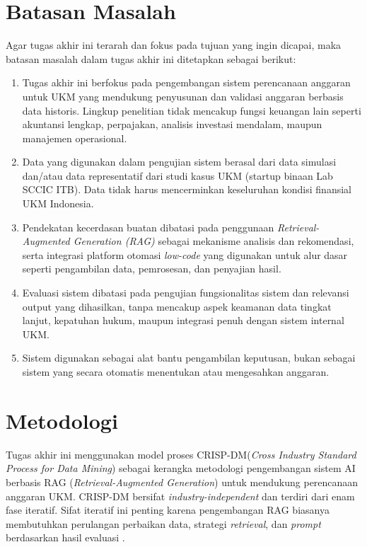 \section{Batasan Masalah}
Agar tugas akhir ini terarah dan fokus pada tujuan yang ingin dicapai, maka batasan masalah dalam tugas akhir ini ditetapkan sebagai berikut:
\begin{enumerate}
\item   Tugas akhir ini berfokus pada pengembangan sistem perencanaan anggaran untuk UKM yang mendukung penyusunan dan validasi anggaran berbasis data historis. Lingkup penelitian tidak mencakup fungsi keuangan lain seperti akuntansi lengkap, perpajakan, analisis investasi mendalam, maupun manajemen operasional.
\item   Data yang digunakan dalam pengujian sistem berasal dari data simulasi dan/atau data representatif dari studi kasus UKM (startup binaan Lab SCCIC ITB). Data tidak harus mencerminkan keseluruhan kondisi finansial UKM Indonesia.
\item   Pendekatan kecerdasan buatan dibatasi pada penggunaan \textit{Retrieval-Augmented Generation (RAG)} sebagai mekanisme analisis dan rekomendasi, serta integrasi platform otomasi \textit{low-code} yang digunakan untuk alur dasar seperti pengambilan data, pemrosesan, dan penyajian hasil.
\item   Evaluasi sistem dibatasi pada pengujian fungsionalitas sistem dan relevansi output yang dihasilkan, tanpa mencakup aspek keamanan data tingkat lanjut, kepatuhan hukum, maupun integrasi penuh dengan sistem internal UKM.
\item   Sistem digunakan sebagai alat bantu pengambilan keputusan, bukan sebagai sistem yang secara otomatis menentukan atau mengesahkan anggaran.
\end{enumerate}

\section{Metodologi}
Tugas akhir ini menggunakan model proses CRISP-DM(\textit{Cross Industry Standard Process for Data Mining}) sebagai kerangka metodologi pengembangan sistem AI berbasis RAG (\textit{Retrieval-Augmented Generation}) untuk mendukung perencanaan anggaran UKM.
CRISP-DM bersifat \textit{industry-independent} dan terdiri dari enam fase iteratif. Sifat iteratif ini penting karena pengembangan RAG biasanya membutuhkan perulangan perbaikan data, strategi \textit{retrieval}, dan \textit{prompt} berdasarkan hasil evaluasi \textcite{chapman2000}.

